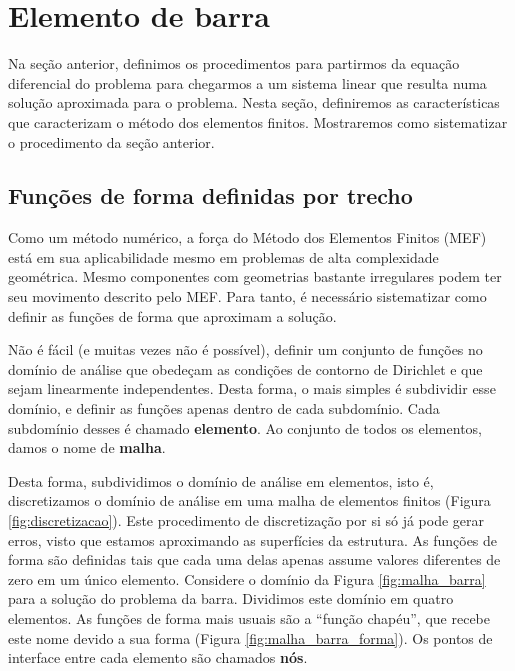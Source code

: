 
\cleardoublepage
\section{Elemento de barra}
\label{sec:elemento_barra}
    Na seção anterior, definimos os procedimentos para partirmos da equação diferencial do problema para chegarmos a um sistema linear que resulta numa solução aproximada para o problema. Nesta seção, definiremos as características que caracterizam o método dos elementos finitos. Mostraremos como sistematizar o procedimento da seção anterior.

    \subsection{Funções de forma definidas por trecho}

        Como um método numérico, a força do Método dos Elementos Finitos (MEF) está em sua aplicabilidade mesmo em problemas de alta complexidade geométrica. Mesmo componentes com geometrias bastante irregulares podem ter seu movimento descrito pelo MEF. Para tanto, é necessário sistematizar como definir as funções de forma que aproximam a solução.

        Não é fácil (e muitas vezes não é possível), definir um conjunto de funções no domínio de análise que obedeçam as condições de contorno de Dirichlet e que sejam linearmente independentes. Desta forma, o mais simples é subdividir esse domínio, e definir as funções apenas dentro de cada subdomínio. Cada subdomínio desses é chamado \textbf{elemento}. Ao conjunto de todos os elementos, damos o nome de \textbf{malha}.

        Desta forma, subdividimos o domínio de análise em elementos, isto é, discretizamos o domínio de análise em uma malha de elementos finitos (Figura \ref{fig:discretizacao}). Este procedimento de discretização por si só já pode gerar erros, visto que estamos aproximando as superfícies da estrutura. As funções de forma são definidas tais que cada uma delas apenas assume valores diferentes de zero em um único elemento. Considere o domínio da Figura \ref{fig:malha_barra} para a solução do problema da barra. Dividimos este domínio em quatro elementos. As funções de forma mais usuais são a ``função chapéu'', que recebe este nome devido a sua forma (Figura \ref{fig:malha_barra_forma}). Os pontos de interface entre cada elemento são chamados \textbf{nós}.

